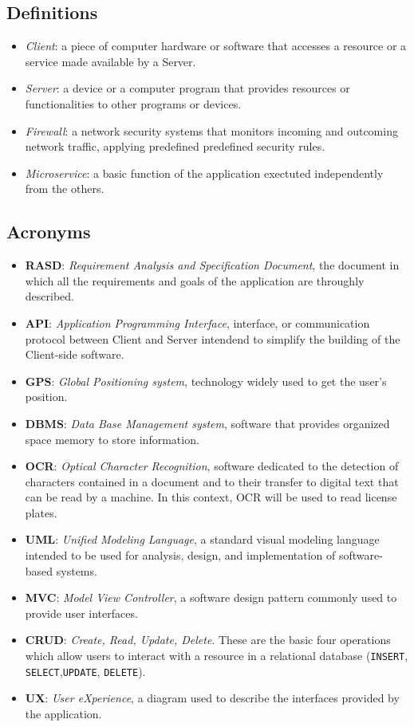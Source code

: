 \documentclass{report}
\begin{document}
\subsection{Definitions}
\begin{itemize}
    \item \textit{Client}: a piece of computer hardware or software that accesses a resource or a service made available by a Server.
    \item \textit{Server}: a device or a computer program that provides resources or functionalities to other programs or devices.
    \item \textit{Firewall}: a network security systems that monitors incoming and outcoming network traffic, applying predefined predefined security rules.
    \item \textit{Microservice}: a basic function of the application exectuted independently from the others.
\end{itemize}
\subsection{Acronyms}
\begin{itemize}
    \item \textbf{RASD}: \textit{Requirement Analysis and Specification Document}, the document in which all the requirements and goals of the application are throughly described.
    \item \textbf{API}: \textit{Application Programming Interface}, interface, or communication protocol between Client and Server intendend to simplify the building of the Client-side software.
    \item \textbf{GPS}: \textit{Global Positioning system}, technology widely used to get the user's position.
    \item \textbf{DBMS}: \textit{Data Base Management system}, software that provides organized space memory to store information.
    \item \textbf{OCR}: \textit{Optical Character Recognition}, software dedicated to the detection of characters contained in a document and to their transfer to digital text that can be read by a machine. In this context, OCR will be used to read license plates.
    \item \textbf{UML}: \textit{Unified Modeling Language}, a standard visual modeling language intended to be used for analysis, design, and implementation of software-based systems.
    \item \textbf{MVC}: \textit{Model View Controller}, a software design pattern commonly used to provide user interfaces.
    \item \textbf{CRUD}: \textit{Create, Read, Update, Delete}. These are the basic four operations which allow users to interact with a resource in a relational database (\texttt{INSERT}, \texttt{SELECT},\texttt{UPDATE}, \texttt{DELETE}).
    \item \textbf{UX}: \textit{User eXperience}, a diagram used to describe the interfaces provided by the application.
    \end{itemize}
\end{document}
